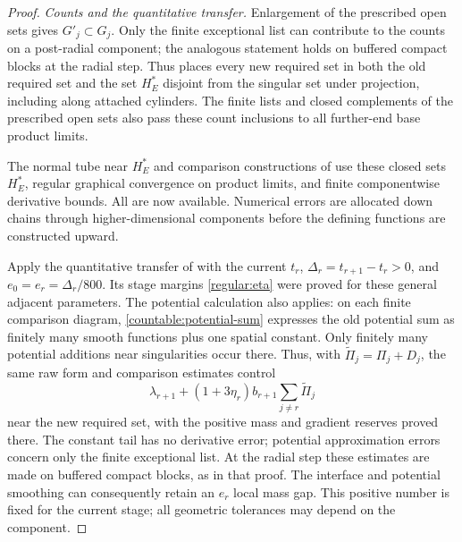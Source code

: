 \begin{proof}
\emph{Counts and the quantitative transfer.}
Enlargement of the prescribed open sets gives $G'_j\subset G_j$. Only the finite exceptional
list can contribute to the counts on a post-radial component; the analogous
statement holds on buffered compact blocks at the radial step.
Thus  places every new required set in both the old
required set and the set $H_E^*$ disjoint from the singular set under projection, including along
attached cylinders. The finite lists and closed complements of the prescribed open sets also
pass these count inclusions to all further-end base product limits.

The normal tube near $H_E^*$ and comparison constructions of
 use these closed sets $H_E^*$,
regular graphical convergence on product limits, and finite
componentwise derivative bounds. All are now available. Numerical
errors are allocated down chains through higher-dimensional components before the defining functions
are constructed upward.

Apply the quantitative transfer of  with the
current $t_r$, $\Delta_r=t_{r+1}-t_r>0$, and $e_0=e_r=\Delta_r/800$.
Its stage margins \eqref{regular:eta} were proved for these general
adjacent parameters.
The potential calculation also applies: on each finite comparison
diagram, \eqref{countable:potential-sum} expresses the old potential
sum as finitely many smooth functions plus one spatial constant.
Only finitely many potential additions near singularities occur there. Thus, with
$\widetilde\Pi_j=\Pi_j+D_j$, the same raw form and comparison estimates
control
\begin{equation}\label{countable:raw-target}
 \lambda_{r+1}+(1+3\eta_r)b_{r+1}
                         \sum_{j\ne r}\widetilde\Pi_j
\end{equation}
near the new required set, with the positive mass and gradient reserves
proved there. The constant tail has no derivative error; potential
approximation errors concern only the finite exceptional list. At the
radial step these estimates are made on buffered compact blocks, as
in that proof.
The interface and potential smoothing can consequently retain an $e_r$
local mass gap. This positive number is fixed for the current stage;
all geometric tolerances may depend on the component.


\end{proof}
